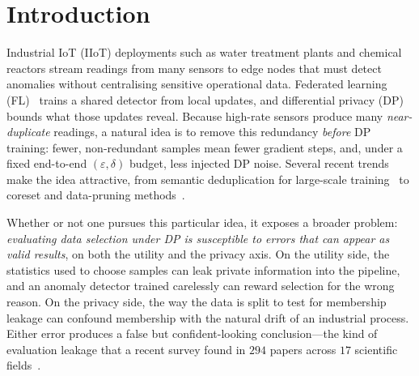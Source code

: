 \documentclass[pdflatex,sn-mathphys-num]{sn-jnl}
\theoremstyle{thmstyleone}
\theoremstyle{thmstyletwo}
\theoremstyle{thmstylethree}
\begin{document}

\maketitle

\section{Introduction}\label{sec:intro}

Industrial IoT (IIoT) deployments such as water treatment plants and chemical
reactors stream readings from many sensors to edge nodes that must detect
anomalies without centralising sensitive operational data. Federated learning
(FL)~\cite{mcmahan2017communication} trains a shared detector from local updates,
and differential privacy (DP)~\cite{abadi2016deep} bounds what those updates
reveal. Because high-rate sensors produce many \emph{near-duplicate} readings,
a natural idea is to remove this redundancy \emph{before} DP training: fewer,
non-redundant samples mean fewer gradient steps, and, under a fixed end-to-end
$(\varepsilon,\delta)$ budget, less injected DP noise. Several recent trends make
the idea attractive, from semantic deduplication for large-scale
training~\cite{lee2022dedup,abbas2023semdedup} to coreset and data-pruning
methods~\cite{marion2023scaling}.

Whether or not one pursues this particular idea, it exposes a broader problem:
\emph{evaluating data selection under DP is susceptible to errors that can appear as valid results}, on both the utility and the privacy axis. On the utility side, the statistics
used to choose samples can leak private information into the pipeline, and an anomaly
detector trained carelessly can reward selection for the wrong reason. On the privacy
side, the way the data is split to test for membership leakage can confound membership
with the natural drift of an industrial process. Either error produces a false but confident-looking conclusion---the kind of evaluation leakage that a recent
survey found in $294$ papers across $17$ scientific fields~\cite{kapoor2023leakage}.
\end{document}
